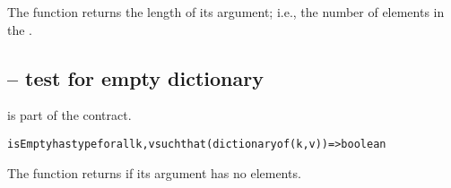 The  function returns the length of its  argument; i.e., the number of elements in the .


\subsection{ -- test for empty dictionary}
\label{emptyMapFunction}
 is part of the  contract.
\begin{alltt}
isEmpty has type for all k,v such that (dictionary of (k,v))=>boolean
\end{alltt}

The  function returns  if its argument has no elements.


